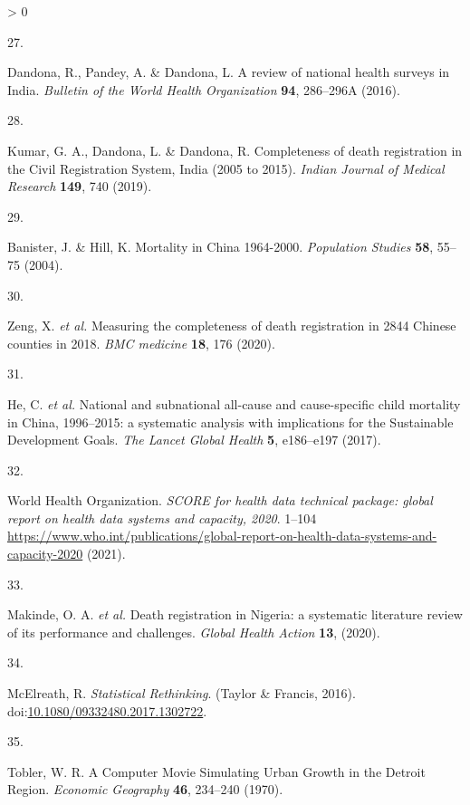 \documentclass[
]{article}
\newlength{\cslhangindent}
\newlength{\csllabelwidth}
\newenvironment{CSLReferences}[2] %
 {%
  \setlength{\parindent}{0pt}
  \ifodd #1 \everypar{\setlength{\hangindent}{\cslhangindent}}\ignorespaces\fi
  \ifnum #2 > 0
  \setlength{\parskip}{#2\baselineskip}
  \fi
 }%
 {}
\newcommand{\CSLLeftMargin}[1]{\parbox[t]{\csllabelwidth}{#1}}
\newcommand{\CSLRightInline}[1]{\parbox[t]{\linewidth - \csllabelwidth}{#1}\break}
\begin{document}
\begin{CSLReferences}{0}{0}
\leavevmode\hypertarget{ref-Dandona2016}{}%
\CSLLeftMargin{27. }
\CSLRightInline{Dandona, R., Pandey, A. \& Dandona, L. {A review of national health surveys in India}. \emph{Bulletin of the World Health Organization} \textbf{94}, 286--296A (2016).}

\leavevmode\hypertarget{ref-Kumar2019}{}%
\CSLLeftMargin{28. }
\CSLRightInline{Kumar, G. A., Dandona, L. \& Dandona, R. {Completeness of death registration in the Civil Registration System, India (2005 to 2015)}. \emph{Indian Journal of Medical Research} \textbf{149}, 740 (2019).}

\leavevmode\hypertarget{ref-Banister2004}{}%
\CSLLeftMargin{29. }
\CSLRightInline{Banister, J. \& Hill, K. {Mortality in China 1964-2000}. \emph{Population Studies} \textbf{58}, 55--75 (2004).}

\leavevmode\hypertarget{ref-Zeng2020}{}%
\CSLLeftMargin{30. }
\CSLRightInline{Zeng, X. \emph{et al.} {Measuring the completeness of death registration in 2844 Chinese counties in 2018}. \emph{BMC medicine} \textbf{18}, 176 (2020).}

\leavevmode\hypertarget{ref-He2017}{}%
\CSLLeftMargin{31. }
\CSLRightInline{He, C. \emph{et al.} {National and subnational all-cause and cause-specific child mortality in China, 1996--2015: a systematic analysis with implications for the Sustainable Development Goals}. \emph{The Lancet Global Health} \textbf{5}, e186--e197 (2017).}

\leavevmode\hypertarget{ref-WorldHealthOrganization2021}{}%
\CSLLeftMargin{32. }
\CSLRightInline{World Health Organization. \emph{{SCORE for health data technical package: global report on health data systems and capacity, 2020}}. 1--104 \url{https://www.who.int/publications/global-report-on-health-data-systems-and-capacity-2020} (2021).}

\leavevmode\hypertarget{ref-Makinde2020}{}%
\CSLLeftMargin{33. }
\CSLRightInline{Makinde, O. A. \emph{et al.} {Death registration in Nigeria: a systematic literature review of its performance and challenges}. \emph{Global Health Action} \textbf{13}, (2020).}

\leavevmode\hypertarget{ref-McElreath2016}{}%
\CSLLeftMargin{34. }
\CSLRightInline{McElreath, R. \emph{{Statistical Rethinking}}. (Taylor {\&} Francis, 2016). doi:\href{https://doi.org/10.1080/09332480.2017.1302722}{10.1080/09332480.2017.1302722}.}

\leavevmode\hypertarget{ref-Tobler1970}{}%
\CSLLeftMargin{35. }
\CSLRightInline{Tobler, W. R. {A Computer Movie Simulating Urban Growth in the Detroit Region}. \emph{Economic Geography} \textbf{46}, 234--240 (1970).}


\end{CSLReferences}
\end{document}

